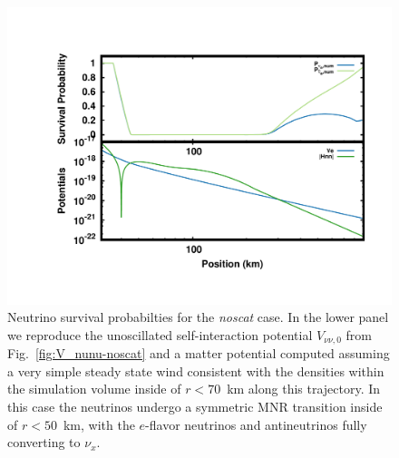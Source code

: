\documentclass[aps,floatfix,prd,superscriptaddress,twocolumn]{revtex4-1}
\begin{document}
\begin{figure}
  \includegraphics[width=\columnwidth]{fig-survival_prob-noscat_nh}
  \caption{Neutrino survival probabilties for the \emph{noscat} case.
    In the lower panel we reproduce the unoscillated self-interaction potential
    $V_{\nu\nu,0}$ from Fig.~\ref{fig:V_nunu-noscat} and a matter potential
    computed assuming a very simple steady state wind consistent with the
    densities within the simulation volume inside of $r<70$~km
    along this trajectory.
    In this case the neutrinos undergo a symmetric MNR transition
    inside of $r<50$~km,
    with the $e$-flavor neutrinos and antineutrinos fully converting to $\nu_x$.
  }
  \label{fig:survival-noscat}
\end{figure}
\end{document}

